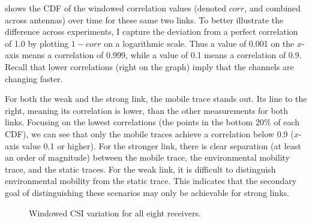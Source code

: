  shows the CDF of the windowed correlation values (denoted $\mathit{corr}$, and combined across antennas) over time for these same two links. To better illustrate the difference across experiments, I capture the deviation from a perfect correlation of 1.0 by plotting $1-\mathit{corr}$ on a logarithmic scale. Thus a value of 0.001 on the $x$-axis means a correlation of 0.999, while a value of 0.1 means a correlation of 0.9. Recall that lower correlations (right on the graph) imply that the channels are changing faster.

For both the weak and the strong link, the mobile trace stands out. Its line to the right, meaning its correlation is lower, than the other measurements for both links. Focusing on the lowest correlations (the points in the bottom 20\% of each CDF), we can see that only the mobile traces achieve a correlation below 0.9 ($x$-axis value 0.1 or higher). For the stronger link, there is clear separation (at least an order of magnitude) between the mobile trace, the environmental mobility trace, and the static traces. For the weak link, it is difficult to distinguish environmental mobility from the static trace. This indicates that the secondary goal of distinguishing these scenarios may only be achievable for strong links.

\begin{figure}[htbp]
	\centering
	\hspace{0.03\textwidth}%
	\hspace{0.03\textwidth}%
	\caption[Windowed CSI variation for all eight receivers]{\label{fig:mobility_csi_alllinks_cdf}Windowed CSI variation for all eight receivers.}
\end{figure}

